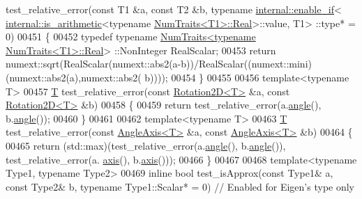 \begin{DoxyCode}
      test\_relative\_error(\textcolor{keyword}{const} T1 &a, \textcolor{keyword}{const} T2 &b, \textcolor{keyword}{typename} \hyperlink{struct_eigen_1_1internal_1_1enable__if}{internal::enable\_if}<
      \hyperlink{struct_eigen_1_1internal_1_1is__arithmetic}{internal::is\_arithmetic}<\textcolor{keyword}{typename} \hyperlink{group___sparse_core___module}{NumTraits<T1>::Real}>::value, T1>
      ::type* = 0)
00451 \{
00452   \textcolor{keyword}{typedef} \textcolor{keyword}{typename} \hyperlink{group___core___module_struct_eigen_1_1_num_traits}{NumTraits<typename NumTraits<T1>::Real}>
      ::NonInteger RealScalar;
00453   \textcolor{keywordflow}{return} numext::sqrt(RealScalar(numext::abs2(a-b))/RealScalar((numext::mini)(numext::abs2(a),numext::abs2(
      b))));
00454 \}
00455 
00456 \textcolor{keyword}{template}<\textcolor{keyword}{typename} T>
00457 \hyperlink{group___sparse_core___module}{T} test\_relative\_error(\textcolor{keyword}{const} \hyperlink{group___geometry___module_class_eigen_1_1_rotation2_d}{Rotation2D<T>} &a, \textcolor{keyword}{const} \hyperlink{group___geometry___module_class_eigen_1_1_rotation2_d}{Rotation2D<T>} &b)
00458 \{
00459   \textcolor{keywordflow}{return} test\_relative\_error(a.\hyperlink{group___geometry___module_af34ab8da6bfe010ca66c8acafa239a6e}{angle}(), b.\hyperlink{group___geometry___module_af34ab8da6bfe010ca66c8acafa239a6e}{angle}());
00460 \}
00461 
00462 \textcolor{keyword}{template}<\textcolor{keyword}{typename} T>
00463 \hyperlink{group___sparse_core___module}{T} test\_relative\_error(\textcolor{keyword}{const} \hyperlink{group___geometry___module_class_eigen_1_1_angle_axis}{AngleAxis<T>} &a, \textcolor{keyword}{const} \hyperlink{group___geometry___module_class_eigen_1_1_angle_axis}{AngleAxis<T>} &b)
00464 \{
00465   \textcolor{keywordflow}{return} (std::max)(test\_relative\_error(a.\hyperlink{group___geometry___module_a83d3c08a73c111550b7e480d3ed043d4}{angle}(), b.\hyperlink{group___geometry___module_a83d3c08a73c111550b7e480d3ed043d4}{angle}()), test\_relative\_error(a.
      \hyperlink{group___geometry___module_ae40cc36c8dcd9977e1540d91a80696bb}{axis}(), b.\hyperlink{group___geometry___module_ae40cc36c8dcd9977e1540d91a80696bb}{axis}()));
00466 \}
00467 
00468 \textcolor{keyword}{template}<\textcolor{keyword}{typename} Type1, \textcolor{keyword}{typename} Type2>
00469 \textcolor{keyword}{inline} \textcolor{keywordtype}{bool} test\_isApprox(\textcolor{keyword}{const} Type1& a, \textcolor{keyword}{const} Type2& b, \textcolor{keyword}{typename} Type1::Scalar* = 0) \textcolor{comment}{// Enabled for
       Eigen's type only}

\end{DoxyCode}
